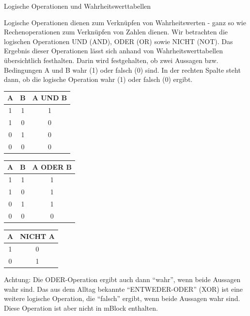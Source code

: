 

\begin{zsfg}{Logische Operationen und Wahrheitswerttabellen}
	
	Logische Operationen dienen zum Verknüpfen von Wahrheitswerten - ganz so wie Rechenoperationen zum Verknüpfen von Zahlen dienen. Wir betrachten die logischen Operationen UND (AND), ODER (OR) sowie NICHT (NOT). Das Ergebnis dieser Operationen lässt sich anhand von Wahrheitswerttabellen übersichtlich festhalten. Darin wird festgehalten, ob zwei Aussagen bzw. Bedingungen A und B wahr (1) oder falsch (0) sind. In der rechten Spalte steht dann, ob die logische Operation wahr (1) oder falsch (0) ergibt.
	
	\medskip
	\begin{minipage}{0.3\textwidth}
		\centering
		\begin{tabular}{c | c | c}
			\textbf{A} & \textbf{B} & \textbf{A UND B} \\ \hline
			1 & 1 & 1 \\
			1 & 0 & 0 \\
			0 & 1 & 0 \\
			0 & 0 & 0 \\  
		\end{tabular}
	\end{minipage}
	\hfill
	\begin{minipage}{0.3\textwidth}
		\centering
		\begin{tabular}{c | c | c}
			\textbf{A} & \textbf{B} & \textbf{A ODER B} \\ \hline
			1 & 1 & 1 \\
			1 & 0 & 1 \\
			0 & 1 & 1 \\
			0 & 0 & 0 \\  
		\end{tabular}
	\end{minipage}
	\hfill
	\begin{minipage}[t]{0.3\textwidth}
		\centering
		\begin{tabular}{c | c}
			\textbf{A}  & \textbf{NICHT A} \\ \hline
			1 & 0 \\
			0 & 1 \\  
		\end{tabular}
	\end{minipage}
	
	\medskip
	Achtung: Die ODER-Operation ergibt auch dann \enquote{wahr}, wenn beide Aussagen wahr sind. Das aus dem Alltag bekannte \enquote{ENTWEDER-ODER} (XOR) ist eine weitere logische Operation, die \enquote{falsch} ergibt, wenn beide Aussagen wahr sind. Diese Operation ist aber nicht in mBlock enthalten.
\end{zsfg}


